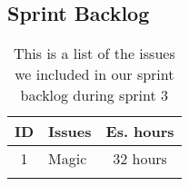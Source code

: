 \subsection{Sprint Backlog}\label{subsec:spr3_sprblog}
\begin{longtable} { | c | p{12cm} | c | } 
\hline
	ID 	&	Issues	&	Es. hours  \\\hline
	1	& 	Magic	&	32 hours  \\\hline
\caption{This is a list of the issues we included in our sprint backlog during sprint 3}
\label{tab:spr3_prodblog}
\end{longtable}